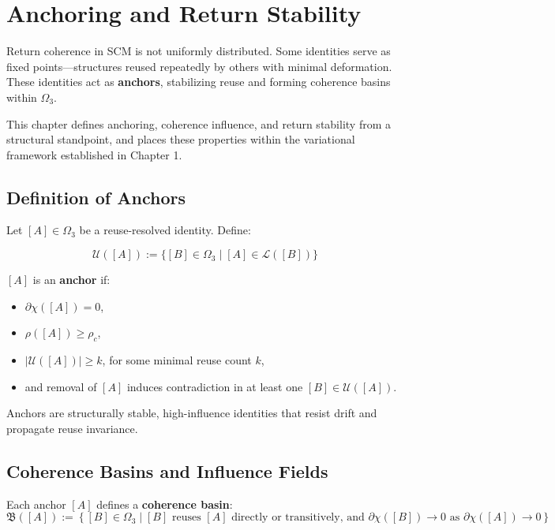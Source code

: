 \chapter{Anchoring and Return Stability} \label{chapter-anchoring}

Return coherence in SCM is not uniformly distributed. Some identities serve as fixed points—structures reused repeatedly by others with minimal deformation. These identities act as \textbf{anchors}, stabilizing reuse and forming coherence basins within $\Omega_3$.

This chapter defines anchoring, coherence influence, and return stability from a structural standpoint, and places these properties within the variational framework established in Chapter 1.

\section{Definition of Anchors} \label{sec:anchor-definition}

Let $[A] \in \Omega_3$ be a reuse-resolved identity. Define:

\[
\mathcal{U}([A]) := \{ [B] \in \Omega_3 \mid [A] \in \mathcal{L}([B]) \}
\]

$[A]$ is an \textbf{anchor} if:

\begin{itemize}
  \item $\partial\chi([A]) = 0$,
  \item $\rho([A]) \geq \rho_c$,
  \item $|\mathcal{U}([A])| \geq k$, for some minimal reuse count $k$,
  \item and removal of $[A]$ induces contradiction in at least one $[B] \in \mathcal{U}([A])$.
\end{itemize}

Anchors are structurally stable, high-influence identities that resist drift and propagate reuse invariance.

\section{Coherence Basins and Influence Fields} \label{sec:coherence-basins}

Each anchor $[A]$ defines a \textbf{coherence basin}:
\[
\mathfrak{B}([A]) := \left\{ [B] \in \Omega_3 \mid \text{$[B]$ reuses $[A]$ directly or transitively, and } \partial\chi([B]) \to 0 \text{ as } \partial\chi([A]) \to 0 \right\}
\]

